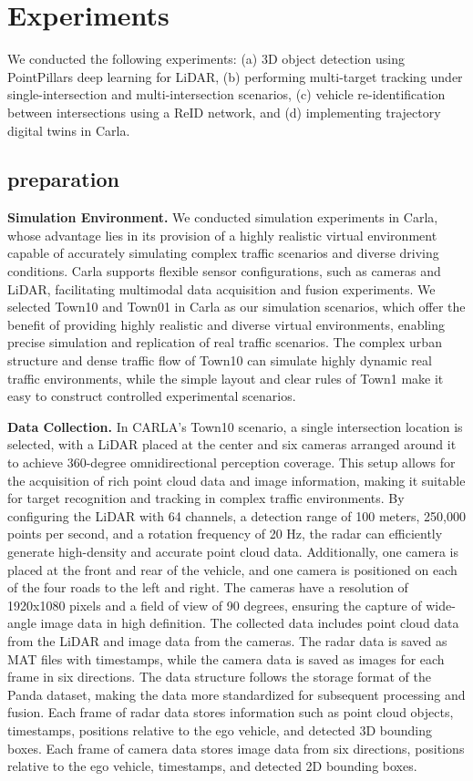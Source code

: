 \section{Experiments}

We conducted the following experiments: 
(a) 3D object detection using PointPillars deep learning for LiDAR, 
(b) performing multi-target tracking under single-intersection and multi-intersection scenarios, 
(c) vehicle re-identification between intersections using a ReID network, and 
(d) implementing trajectory digital twins in Carla.

\subsection{preparation}

\textbf{Simulation Environment.}
We conducted simulation experiments in Carla, whose advantage lies in its provision of a highly realistic virtual environment capable of accurately simulating complex traffic scenarios and diverse driving conditions. 
Carla supports flexible sensor configurations, such as cameras and LiDAR, facilitating multimodal data acquisition and fusion experiments\cite{Alpher22e}. 
We selected Town10 and Town01 in Carla as our simulation scenarios, which offer the benefit of providing highly realistic and diverse virtual environments, enabling precise simulation and replication of real traffic scenarios. 
The complex urban structure and dense traffic flow of Town10 can simulate highly dynamic real traffic environments, while the simple layout and clear rules of Town1 make it easy to construct controlled experimental scenarios.

\textbf{Data Collection.}
In CARLA's Town10 scenario, a single intersection location is selected, with a LiDAR placed at the center and six cameras arranged around it to achieve 360-degree omnidirectional perception coverage. 
This setup allows for the acquisition of rich point cloud data and image information, making it suitable for target recognition and tracking in complex traffic environments. 
By configuring the LiDAR with 64 channels, a detection range of 100 meters, 250,000 points per second, and a rotation frequency of 20 Hz, the radar can efficiently generate high-density and accurate point cloud data. 
Additionally, one camera is placed at the front and rear of the vehicle, and one camera is positioned on each of the four roads to the left and right. 
The cameras have a resolution of 1920x1080 pixels and a field of view of 90 degrees, ensuring the capture of wide-angle image data in high definition. 
The collected data includes point cloud data from the LiDAR and image data from the cameras. 
The radar data is saved as MAT files with timestamps, while the camera data is saved as images for each frame in six directions. 
The data structure follows the storage format of the Panda dataset, making the data more standardized for subsequent processing and fusion\cite{Alpher21c}. 
Each frame of radar data stores information such as point cloud objects, timestamps, positions relative to the ego vehicle, and detected 3D bounding boxes. 
Each frame of camera data stores image data from six directions, positions relative to the ego vehicle, timestamps, and detected 2D bounding boxes.

